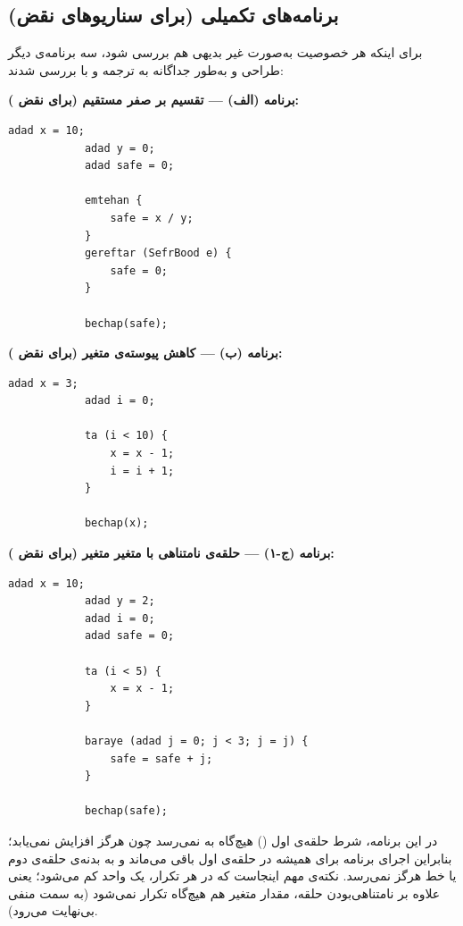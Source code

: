 \documentclass[12pt]{report}
\begin{document}
	\subsection{برنامه‌های تکمیلی (برای سناریوهای نقض)}
	برای اینکه هر خصوصیت به‌صورت غیر بدیهی هم بررسی شود، سه برنامه‌ی  دیگر طراحی و به‌طور جداگانه به  ترجمه و با  بررسی شدند:
	
	\textbf{برنامه (الف) --- تقسیم بر صفر مستقیم (برای نقض ):}
	\begin{latin}
		\begin{lstlisting}[style=hashstyle]
			adad x = 10;
			adad y = 0;
			adad safe = 0;
			
			emtehan {
				safe = x / y;
			}
			gereftar (SefrBood e) {
				safe = 0;
			}
			
			bechap(safe);
		\end{lstlisting}
	\end{latin}
	
	\textbf{برنامه (ب) --- کاهش پیوسته‌ی متغیر (برای نقض ):}
	\begin{latin}
		\begin{lstlisting}[style=hashstyle]
			adad x = 3;
			adad i = 0;
			
			ta (i < 10) {
				x = x - 1;
				i = i + 1;
			}
			
			bechap(x);
		\end{lstlisting}
	\end{latin}
	
	\textbf{برنامه (ج-۱) --- حلقه‌ی نامتناهی با متغیر متغیر (برای نقض ):}
	\begin{latin}
		\begin{lstlisting}[style=hashstyle]
			adad x = 10;
			adad y = 2;
			adad i = 0;
			adad safe = 0;
			
			ta (i < 5) {
				x = x - 1;
			}
			
			baraye (adad j = 0; j < 3; j = j) {
				safe = safe + j;
			}
			
			bechap(safe);
		\end{lstlisting}
	\end{latin}
	در این برنامه، شرط حلقه‌ی اول () هیچ‌گاه به  نمی‌رسد چون  هرگز افزایش نمی‌یابد؛ بنابراین اجرای برنامه برای همیشه در حلقه‌ی اول باقی می‌ماند و به بدنه‌ی حلقه‌ی دوم یا خط  هرگز نمی‌رسد. نکته‌ی مهم اینجاست که در هر تکرار،  یک واحد کم می‌شود؛ یعنی علاوه بر نامتناهی‌بودن حلقه، مقدار متغیر  هم هیچ‌گاه تکرار نمی‌شود (به سمت منفی بی‌نهایت می‌رود).
	
\end{document}

